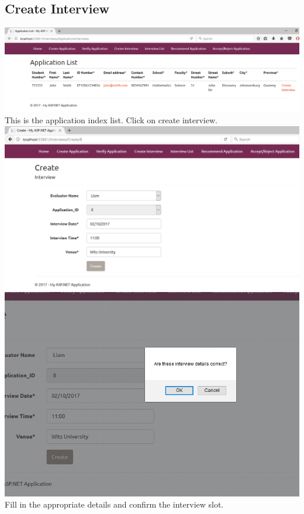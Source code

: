 \documentclass{article}
\begin{document}
\subsection{Create Interview}
\begin{center}
\includegraphics[scale=0.45]{CreateInterview.png}\\
This is the application index list. Click on create interview.\\ \bigskip
\includegraphics[scale=0.5]{CreateInterview2.png}\\
\includegraphics[scale=0.5]{CreateInterview3.png}\\
Fill in the appropriate details and confirm the interview slot.\\ \bigskip
\end{center}
\end{document}
